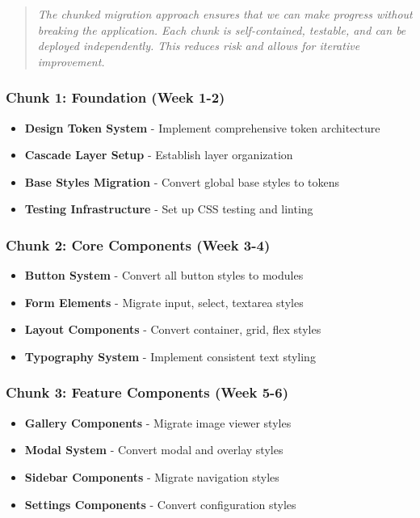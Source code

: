 \documentclass[11pt]{article}
\begin{document}
\begin{quote}
\emph{The chunked migration approach ensures that we can make progress without breaking the application. Each chunk is self-contained, testable, and can be deployed independently. This reduces risk and allows for iterative improvement.}
\end{quote}

\subsubsection{Chunk 1: Foundation (Week 1-2)}

\begin{itemize}
\item \textbf{Design Token System} - Implement comprehensive token architecture
\item \textbf{Cascade Layer Setup} - Establish layer organization
\item \textbf{Base Styles Migration} - Convert global base styles to tokens
\item \textbf{Testing Infrastructure} - Set up CSS testing and linting
\end{itemize}

\subsubsection{Chunk 2: Core Components (Week 3-4)}

\begin{itemize}
\item \textbf{Button System} - Convert all button styles to modules
\item \textbf{Form Elements} - Migrate input, select, textarea styles
\item \textbf{Layout Components} - Convert container, grid, flex styles
\item \textbf{Typography System} - Implement consistent text styling
\end{itemize}

\subsubsection{Chunk 3: Feature Components (Week 5-6)}

\begin{itemize}
\item \textbf{Gallery Components} - Migrate image viewer styles
\item \textbf{Modal System} - Convert modal and overlay styles
\item \textbf{Sidebar Components} - Migrate navigation styles
\item \textbf{Settings Components} - Convert configuration styles
\end{itemize}
\end{document}

